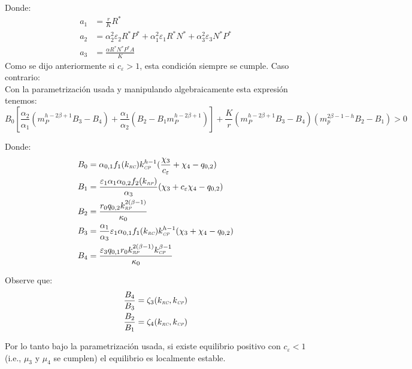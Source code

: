 Donde:
\begin{equation}
  \begin{aligned}
    a_1 &= \frac{r}{K}R^* \\
    a_2 &= \alpha_2^2 \varepsilon_2 R^* P^*  + \alpha_1^2 \varepsilon_1 R^* N^*  + \alpha_3^2 \varepsilon_3 N^* P^*\\
    a_3 &= \frac{\alpha R^* N^* P^* A}{K} 
  \end{aligned}
\end{equation}
Como se dijo anteriormente si $c_\varepsilon > 1$, esta condici\'on siempre se cumple. Caso contrario:\\
Con la parametrizaci\'on usada y manipulando algebraicamente esta expresi\'on tenemos:
\begin{equation}
  B_0 [ \frac{\alpha_2}{\alpha_1}(m_P^{h - 2 \beta + 1} B_3 - B_4) + \frac{\alpha_1}{\alpha_2}(B_2 - B_1m_P^{h - 2 \beta + 1})]  +\frac{K}{r} (m_P^{h-2 \beta + 1} B_3 - B_4) (m_p^{2 \beta - 1 - h} B_2 - B_1)  > 0
\end{equation}

Donde:
\begin{equation}
  \begin{aligned}
    B_0 &= \alpha_{0,1}f_1(k_{\textit{\tiny RC}})k_{\textit{\tiny CP}}^{h - 1} ( \frac{\chi_3}{c_\varepsilon} + \chi_4 - q_{0,2})\\
    B_1 &= \frac{\varepsilon_1 \alpha_1 \alpha_{0,2} f_2(k_{\textit{\tiny RP}})}{\alpha_3}(\chi_3 + c_\varepsilon \chi_4 - q_{0,2}) \\
    B_2 &= \frac{r_0 q_{0,2} k_{\textit{\tiny RP}}^{2(\beta - 1)} }{\kappa_0} \\
    B_3 &= \frac{\alpha_1}{\alpha_3} \varepsilon_1 \alpha_{0,1} f_1(k_{\textit{\tiny RC}}) k_{\textit{\tiny CP}}^{h - 1}(\chi_3 + \chi_4 - q_{0,2})\\
    B_4 &= \frac{\varepsilon_3 q_{0,1} r_0 k_{\textit{\tiny RP}}^{2(\beta - 1)} k_{\textit{\tiny CP}}^{\beta - 1}}{\kappa_0}
  \end{aligned}
\end{equation}

Observe que:
\begin{equation}
  \begin{aligned}
    \frac{B_4}{B_3} &= \zeta_3(k_{\textit{\tiny RC}},k_{\textit{\tiny CP}}) \\
    \frac{B_2}{B_1} &= \zeta_4(k_{\textit{\tiny RC}},k_{\textit{\tiny CP}})
  \end{aligned}
\end{equation}

Por lo tanto bajo la parametrizaci\'on usada, si existe equilibrio positivo con $c_\varepsilon < 1$(i.e.,  $\mu_3$ y $\mu_4$ se cumplen) el equilibrio es localmente estable.\\

